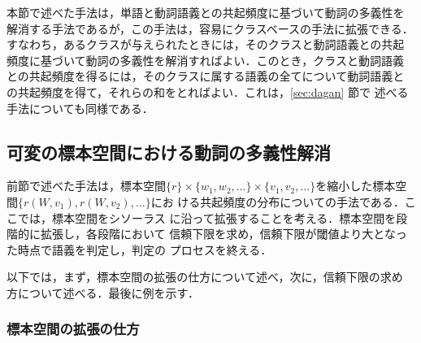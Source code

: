 本節で述べた手法は，単語と動詞語義との共起頻度に基づいて動詞の多義性を
解消する手法であるが，この手法は，容易にクラスベースの手法に拡張できる．
すなわち，あるクラスが与えられたときには，そのクラスと動詞語義との共起
頻度に基づいて動詞の多義性を解消すればよい．このとき，クラスと動詞語義
との共起頻度を得るには，そのクラスに属する語義の全てについて動詞語義と
の共起頻度を得て，それらの和をとればよい．これは，\ref{sec:dagan} 節で
述べる手法についても同様である．

\subsection{可変の標本空間における動詞の多義性解消}
\label{sec:variable}

前節で述べた手法は，標本空間$\{r\} \times \{w_1,w_2,\ldots\} \times
\{v_1,v_2,\dots\}$を縮小した標本空間$\{r(W,v_1),r(W,v_2),\ldots\}$にお
ける共起頻度の分布についての手法である．ここでは，標本空間をシソーラス
に沿って拡張することを考える．標本空間を段階的に拡張し，各段階において
信頼下限を求め，信頼下限が閾値より大となった時点で語義を判定し，判定の
プロセスを終える．

以下では，まず，標本空間の拡張の仕方について述べ，次に，信頼下限の求め
方について述べる．最後に例を示す．

\subsubsection{標本空間の拡張の仕方}

